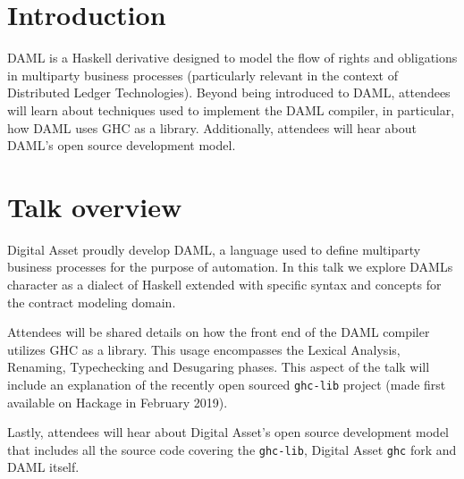 \documentclass[acmsmall]{acmart}
\begin{document}

%

%
\maketitle

\section{Introduction}
DAML is a Haskell derivative designed to model the flow of rights and obligations in multiparty business processes (particularly relevant in the context of Distributed Ledger Technologies). Beyond being introduced to DAML, attendees will learn about techniques used to implement the DAML compiler, in particular, how DAML uses GHC as a library. Additionally, attendees will hear about DAML's open source development model.

\section{Talk overview}
Digital Asset proudly develop DAML, a language used to define multiparty business processes for the purpose of automation. In this talk we explore DAMLs character as a dialect of Haskell extended with specific syntax and concepts for the contract modeling domain.

Attendees will be shared details on how the front end of the DAML compiler utilizes GHC as a library. This usage encompasses the Lexical Analysis, Renaming, Typechecking and Desugaring phases. This aspect of the talk will include an explanation of the recently open sourced \verb|ghc-lib| project (made first available on Hackage in February 2019).

Lastly, attendees will hear about Digital Asset's open source development model that includes all the source code covering the \verb|ghc-lib|, Digital Asset \verb|ghc| fork and DAML itself.
\end{document}
